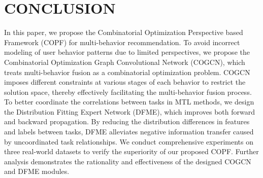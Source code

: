 \section{CONCLUSION}
\label{future works}
In this paper, we propose the Combinatorial Optimization Perspective based Framework  (COPF) for multi-behavior recommendation. To avoid incorrect modeling of user behavior patterns due to limited perspectives, we propose the Combinatorial Optimization Graph Convolutional Network (COGCN), which treats multi-behavior fusion as a combinatorial optimization problem. COGCN imposes different constraints at various stages of each behavior to restrict the solution space, thereby effectively facilitating the multi-behavior fusion process. To better coordinate the correlations between tasks in MTL methods, we design the Distribution Fitting Expert Network (DFME), which improves both forward and backward propagation. By reducing the distribution differences in features and labels between tasks, DFME alleviates negative information transfer caused by uncoordinated task relationships. We conduct comprehensive experiments on three real-world datasets to verify the superiority of our proposed COPF. Further analysis demonstrates the rationality and effectiveness of the designed COGCN and DFME modules.

